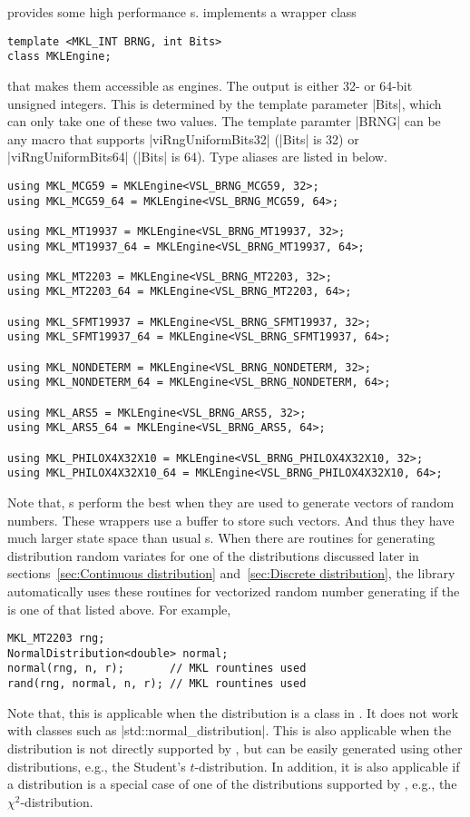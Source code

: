 \mkl provides some high performance \rng{}s. \mckl implements a wrapper class
\begin{verbatim}
template <MKL_INT BRNG, int Bits>
class MKLEngine;
\end{verbatim}
that makes them accessible as \cpp engines. The output is either 32- or 64-bit
unsigned integers. This is determined by the template parameter |Bits|, which
can only take one of these two values. The template paramter |BRNG| can be any
\mkl \brng macro that supports |viRngUniformBits32| (|Bits| is 32) or
|viRngUniformBits64| (|Bits| is 64). Type aliases are listed in below.
\begin{verbatim}
using MKL_MCG59 = MKLEngine<VSL_BRNG_MCG59, 32>;
using MKL_MCG59_64 = MKLEngine<VSL_BRNG_MCG59, 64>;

using MKL_MT19937 = MKLEngine<VSL_BRNG_MT19937, 32>;
using MKL_MT19937_64 = MKLEngine<VSL_BRNG_MT19937, 64>;

using MKL_MT2203 = MKLEngine<VSL_BRNG_MT2203, 32>;
using MKL_MT2203_64 = MKLEngine<VSL_BRNG_MT2203, 64>;

using MKL_SFMT19937 = MKLEngine<VSL_BRNG_SFMT19937, 32>;
using MKL_SFMT19937_64 = MKLEngine<VSL_BRNG_SFMT19937, 64>;

using MKL_NONDETERM = MKLEngine<VSL_BRNG_NONDETERM, 32>;
using MKL_NONDETERM_64 = MKLEngine<VSL_BRNG_NONDETERM, 64>;

using MKL_ARS5 = MKLEngine<VSL_BRNG_ARS5, 32>;
using MKL_ARS5_64 = MKLEngine<VSL_BRNG_ARS5, 64>;

using MKL_PHILOX4X32X10 = MKLEngine<VSL_BRNG_PHILOX4X32X10, 32>;
using MKL_PHILOX4X32X10_64 = MKLEngine<VSL_BRNG_PHILOX4X32X10, 64>;
\end{verbatim}
Note that, \mkl \rng{}s perform the best when they are used to generate vectors
of random numbers. These wrappers use a buffer to store such vectors. And thus
they have much larger state space than usual \rng{}s. When there are \mkl
routines for generating distribution random variates for one of the
distributions discussed later in sections~\ref{sec:Continuous distribution}
and~\ref{sec:Discrete distribution}, the library automatically uses these
routines for vectorized random number generating if the \rng is one of that
listed above. For example,
\begin{verbatim}
MKL_MT2203 rng;
NormalDistribution<double> normal;
normal(rng, n, r);       // MKL rountines used
rand(rng, normal, n, r); // MKL rountines used
\end{verbatim}
Note that, this is applicable when the distribution is a class in \mckl. It
does not work with classes such as |std::normal_distribution|. This is also
applicable when the distribution is not directly supported by \mkl, but can be
easily generated using other distributions, e.g., the Student's
$t$-distribution. In addition, it is also applicable if a distribution is a
special case of one of the distributions supported by \mkl, e.g., the
$\chi^2$-distribution.

